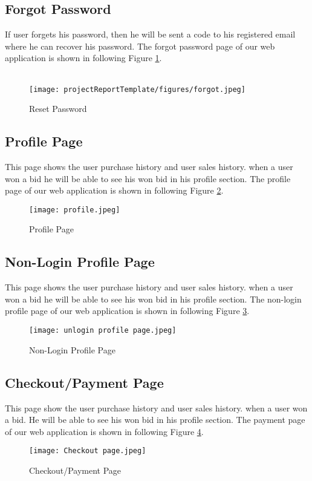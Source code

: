 \subsection{Forgot Password}
If user forgets his password, then he will be sent a code to his registered email where he can recover his password. The forgot password page of our web application is shown in following Figure \ref{fp}.\\\\
\begin{figure}[!h]
    \centering
    \texttt{[image: projectReportTemplate/figures/forgot.jpeg]}
    \caption{Reset Password}
    \label{fp}
\end{figure}


\subsection{Profile Page}
This page shows the user purchase history and user sales history. when a user won a bid he will be able to see his won bid in his profile section. The profile page of our web application is shown in following Figure \ref{pp}.
\begin{figure}[!h]
    \centering
    \texttt{[image: profile.jpeg]}
    \caption{Profile Page}
    \label{pp}
\end{figure}

\subsection{Non-Login Profile Page}
This page shows the user purchase history and user sales history. when a user won a bid he will be able to see his won bid in his profile section. The non-login profile page of our web application is shown in following Figure \ref{nlpp}.
\begin{figure}[!h]
    \centering
    \texttt{[image: unlogin profile page.jpeg]}
    \caption{Non-Login Profile Page}
    \label{nlpp}
\end{figure}
\newpage

\subsection{Checkout/Payment Page}
This page show the user purchase history and user sales history. when a user won a bid. He will be able to see his won bid in his profile section. The payment page of our web application is shown in following Figure \ref{co}.\\
\begin{figure}[!h]
    \centering
    \texttt{[image: Checkout page.jpeg]}
    \caption{Checkout/Payment Page}
    \label{co}
\end{figure}
\newpage
